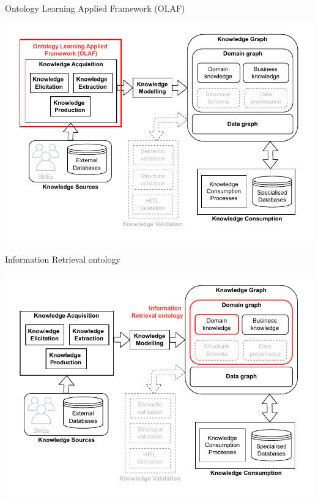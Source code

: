 


\begin{frame}{Ontology Learning Applied Framework (OLAF)}

        \begin{center}
            \includegraphics[scale=0.6]{images/KGBS-knowledge-acquisition-OLAF.pdf} 
        \end{center}

\end{frame}

\begin{frame}{Information Retrieval ontology}

        \begin{center}
            \includegraphics[scale=0.6]{images/KGBS-knowledge-modelling-kg-IR-onto.pdf} 
        \end{center}

\end{frame}

